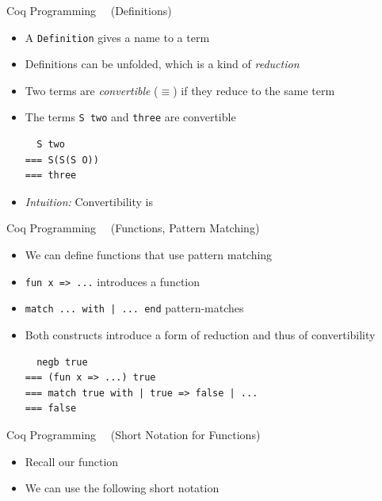\begin{frame}[fragile]{Coq Programming\small~~ (Definitions)}
\begin{itemize}
  \item A \lstinline|Definition| gives a name to a term
  

  \pause

  \item Definitions can be unfolded, which is a kind of \textit{reduction}

  \item Two terms are \textit{convertible} ($\equiv$) if they reduce to the same term

  \item The terms \lstinline|S two| and \lstinline|three| are convertible
\begin{lstlisting}
  S two
=== S(S(S O))
=== three
\end{lstlisting}

  \pause

  \item \textit{Intuition:} Convertibility is 
\end{itemize}
\end{frame}

\begin{frame}[fragile]{Coq Programming\small~~ (Functions, Pattern Matching)}
\begin{itemize}
  \item We can define functions that use pattern matching
  

  \pause

  \item \lstinline|fun x => ...| introduces a function
  \item \lstinline!match ... with | ... end! pattern-matches

  \pause

  \item Both constructs introduce a form of reduction and thus of convertibility
\begin{lstlisting}
  negb true
=== (fun x => ...) true
=== match true with | true => false | ...
=== false
\end{lstlisting}
\end{itemize}
\end{frame}

\begin{frame}[fragile]{Coq Programming\small~~ (Short Notation for Functions)}
\begin{itemize}
  \item Recall our function
  
  \item We can use the following short notation
  
\end{itemize}
\end{frame}

